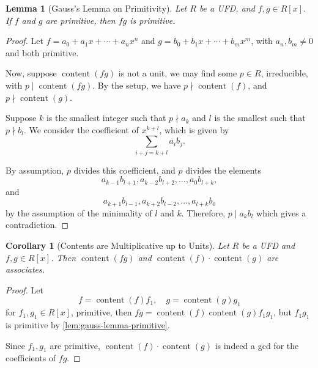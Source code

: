\documentclass{article}
\newtheorem{lemma}[theorem]{Lemma}
\newtheorem{corollary}[theorem]{Corollary}
\theoremstyle{definition}
\theoremstyle{remark}
\newcommand{\pqty}[1]{\left(#1\right)}
\newcommand{\bqty}[1]{\left[#1\right]}
\newcommand{\divides}{\mid}
\newcommand{\notdivides}{\nmid}
\newcommand{\content}{\operatorname{content}}
\begin{document}
\begin{lemma}[Gauss's Lemma on Primitivity]
    \label{lem:gauss-lemma-primitive}
    Let \(R\) be a UFD, and \(f, g \in R\bqty{x}\). If \(f\) and \(g\) are primitive, then \(fg\) is primitive.
\end{lemma}

\begin{proof}
    Let \(f = a_0 + a_1 x + \cdots + a_n x^n\) and \(g = b_0 + b_1 x + \cdots + b_m x^m\), with \(a_n, b_m \neq 0\) and both primitive.

    Now, suppose \(\content\pqty{fg}\) is not a unit, we may find some \(p \in R\), irreducible, with \(p \divides \content\pqty{fg}\). By the setup, we have \(p\notdivides \content\pqty{f}\), and \(p\notdivides \content\pqty{g}\).

    Suppose \(k\) is the smallest integer such that \(p \notdivides a_k\) and \(l\) is the smallest such that \(p \notdivides b_l\). We consider the coefficient of \(x^{k + l}\), which is given by
    \[
        \sum_{i + j = k + l} a_i b_j.
    \]

    By assumption, \(p\) divides this coefficient, and \(p\) divides the elements
    \[
        a_{k - 1} b_{l + 1}, a_{k - 2} b_{l + 2}, \ldots, a_0 b_{l + k},
    \]
    and
    \[
        a_{k + 1} b_{l - 1}, a_{k + 2} b_{l - 2}, \ldots, a_{l + k} b_0
    \]
    by the assumption of the minimality of \(l\) and \(k\). Therefore, \(p \divides a_k b_l\) which gives a contradiction. 
\end{proof}

\begin{corollary}[Contents are Multiplicative up to Units]
    \label{cor:content-multiplicative}%
    Let \(R\) be a UFD and \(f, g \in R\bqty{x}\). Then \(\content\pqty{fg}\) and \(\content\pqty{f} \cdot \content\pqty{g}\) are associates.
\end{corollary}

\begin{proof}
    Let
    \[
        f = \content\pqty{f} f_1, \quad g = \content\pqty{g} g_1
    \]
    for \(f_1, g_1 \in R\bqty{x}\), primitive, then \(fg = \content\pqty{f} \content\pqty{g} f_1 g_1\), but \(f_1 g_1\) is primitive by \autoref{lem:gauss-lemma-primitive}.

    Since \(f_1, g_1\) are primitive, \(\content\pqty{f} \cdot \content\pqty{g}\) is indeed a gcd for the coefficients of \(fg\).
\end{proof}
\end{document}
